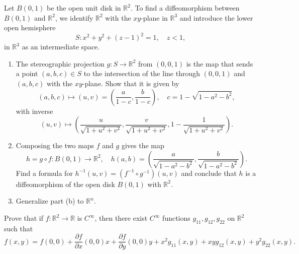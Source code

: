 \documentclass[en, oneside]{vivi}
\begin{document}
\begin{prob}
    Let $B(0, 1)$ be the open unit disk in $\mathbb{R}^2$. To find a diffeomorphism between $B(0, 1)$ and $\mathbb{R}^2$, we identify $\mathbb{R}^2$ with the $xy$-plane in $\mathbb{R}^3$ and introduce the lower open hemisphere
    \begin{equation*}
        S : x^2 + y^2 + (z - 1)^2 = 1, \quad z < 1,
    \end{equation*}
    in $\mathbb{R}^3$ as an intermediate space.
    \begin{enumerate}[label=(\alph*)]
        \item The stereographic projection $g : S \to \mathbb{R}^2$ from $(0, 0, 1)$ is the map that sends a point $(a, b, c) \in S$ to the intersection of the line through $(0, 0, 1)$ and $(a, b, c)$ with the $xy$-plane. Show that it is given by
        \begin{equation*}
            (a, b, c) \mapsto (u, v) = \left( \frac{a}{1 - c}, \frac{b}{1 - c} \right), \quad c = 1 - \sqrt{1 - a^2 - b^2},
        \end{equation*}
        with inverse
        \begin{equation*}
            (u, v) \mapsto \left( \frac{u}{\sqrt{1 + u^2 + v^2}}, \frac{v}{\sqrt{1 + u^2 + v^2}}, 1 - \frac{1}{\sqrt{1 + u^2 + v^2}} \right).
        \end{equation*}
        \item Composing the two maps $f$ and $g$ gives the map
        \begin{equation*}
            h = g \circ f : B(0, 1) \to \mathbb{R}^2, \quad h(a, b) = \left( \frac{a}{\sqrt{1 - a^2 - b^2}}, \frac{b}{\sqrt{1 - a^2 - b^2}} \right).
        \end{equation*}
        Find a formula for $h^{-1}(u, v) = (f^{-1} \circ g^{-1})(u, v)$ and conclude that $h$ is a diffeomorphism of the open disk $B(0, 1)$ with $\mathbb{R}^2$.
        \item Generalize part (b) to $\mathbb{R}^n$.
    \end{enumerate}
\end{prob}

\begin{prob}
    Prove that if $f : \mathbb{R}^2 \to \mathbb{R}$ is $C^\infty$, then there exist $C^\infty$ functions $g_{11}, g_{12}, g_{22}$ on $\mathbb{R}^2$ such that
    \begin{equation*}
        f(x, y) = f(0, 0) + \frac{\partial f}{\partial x}(0, 0)x + \frac{\partial f}{\partial y}(0, 0)y + x^2 g_{11}(x, y) + xy g_{12}(x, y) + y^2 g_{22}(x, y).
    \end{equation*}
\end{prob}
\end{document}
